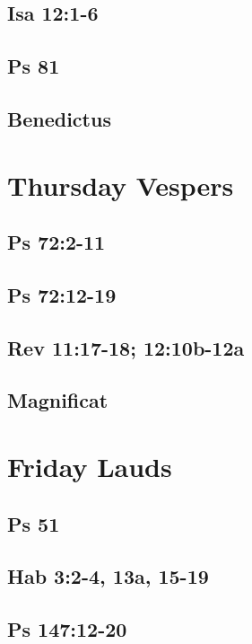 \subsection{Isa 12:1-6}

\subsection{Ps 81}

\subsection{Benedictus}


\section{Thursday Vespers}

\subsection{Ps 72:2-11}

\subsection{Ps 72:12-19}

\subsection{Rev 11:17-18; 12:10b-12a}

\subsection{Magnificat}


\section{Friday Lauds}

\subsection{Ps 51}

\subsection{Hab 3:2-4, 13a, 15-19}

\subsection{Ps 147:12-20}

